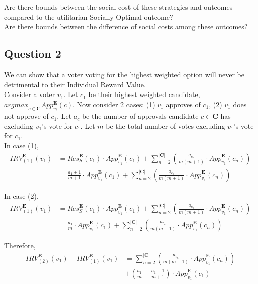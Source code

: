 \documentclass{article}
\begin{document}
Are there bounds between the social cost of these strategies and outcomes compared to the utilitarian Socially Optimal outcome?\\
Are there bounds between the difference of social costs among these outcomes?

\subsection{Question 2}
We can show that a voter voting for the highest weighted option will never be detrimental to their Individual Reward Value.\\

Consider a voter $v_{1}$. Let $c_{1}$ be their highest weighted candidate, ${argmax}_{c \in \pmb{C}}App^{\pmb{E}}_{v_{i}}(c)$. Now consider 2 cases: (1) $v_{1}$ approves of $c_{1}$, (2) $v_{1}$ does not approve of $c_{1}$. Let $a_{c}$ be the number of approvals candidate $c \in \pmb{C}$ has excluding $v_{1}$'s vote for $c_{1}$. Let $m$ be the total number of votes excluding $v_{1}$'s vote for $c_{1}$.\\

In case (1), 
\begin{equation}
\begin{aligned}
{IRV}^{\pmb{E}}_{(1)}(v_1) 
&= {Res}^{\pmb{E}}_{S}(c_1)\cdot{App}^{\pmb{E}}_{v_1}(c_1) + \sum^{|\pmb{C}|}_{n = 2}{\left(\frac{a_{c_n}}{m(m+1)}\cdot{App}^{\pmb{E}}_{v_1}(c_{n})\right)}\\
&= \frac{a_1+1}{m+1}\cdot{App}^{\pmb{E}}_{v_1}(c_1) + \sum^{|\pmb{C}|}_{n = 2}{\left(\frac{a_{c_n}}{m(m+1)}\cdot{App}^{\pmb{E}}_{v_1}(c_{n})\right)}
\end{aligned}  
\end{equation}

In case (2), 
\begin{equation}
\begin{aligned}
{IRV}^{\pmb{E}}_{(1)}(v_1) 
&= {Res}^{\pmb{E}}_{S}(c_1)\cdot{App}^{\pmb{E}}_{v_1}(c_1) + \sum^{|\pmb{C}|}_{n = 2}{\left(\frac{a_{c_n}}{m(m+1)}\cdot{App}^{\pmb{E}}_{v_1}(c_{n})\right)}\\
&= \frac{a_1}{m}\cdot{App}^{\pmb{E}}_{v_1}(c_1) + \sum^{|\pmb{C}|}_{n = 2}{\left(\frac{a_{c_n}}{m(m+1)}\cdot{App}^{\pmb{E}}_{v_1}(c_{n})\right)}
\end{aligned}  
\end{equation}

Therefore,
\begin{equation}\label{IRV_DIFF}
\begin{aligned}
{IRV}^{\pmb{E}}_{(2)}(v_1) - {IRV}^{\pmb{E}}_{(1)}(v_1)
&=  \sum^{|\pmb{C}|}_{n = 2}{\left(\frac{a_{c_{n}}}{m(m+1)}\cdot{App}^{\pmb{E}}_{v_1}(c_{n})\right)}\\
&+ \left(\frac{a_1}{m}-\frac{a_{1}+1}{m+1}\right)\cdot{App}^{\pmb{E}}_{v_1}(c_1)\\
\end{aligned}  
\end{equation}
\end{document}
